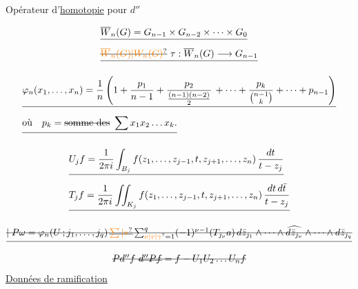 Opérateur d'\uline{homotopie} pour $d''$

\[
\begin{aligned}
&\deleted{\overline W_n(G)=G_{n-1}\times G_{n-2}\times\cdots\times G_0}\\
&\deleted{\deleted{\unsure{\overline W_n(G)|W_n(G)}}\ \tau:\overline W_n(G)\longrightarrow G_{n-1}}
\end{aligned}
\]

\[
\begin{aligned}
&\deleted{\varphi_n(x_1,\ldots,x_n)=\frac1n\left(1+\frac{p_1}{n-1}
+\frac{p_2}{\frac{(n-1)(n-2)}2}\,+\cdots+
\frac{p_k}{\binom{n-1}{k}}+\cdots+p_{n-1}\right)}\\
&\deleted{\text{où}\quad p_k=\deleted{\text{somme des}}\ \sum x_1 x_2\ldots x_k.}
\end{aligned}
\]

\[
\begin{aligned}
&\deleted{U_j f=\frac{1}{2\pi i}\int_{B_j} f(z_1,\ldots,z_{j-1},t,z_{j+1},\ldots,z_n)\,\frac{dt}{t-z_j}}\\
&\deleted{T_j f=\frac{1}{2\pi i}\iint_{K_j} f(z_1,\ldots,z_{j-1},t,z_{j+1},\ldots,z_n)\,\frac{dt\,d\bar t}{t-z_j}}
\end{aligned}
\]


\[
\deleted{\underline{\left|\vphantom{\sum^q}\right. P\omega=\varphi_n(U\,;j_1,\ldots,j_q)\,\deleted{\unsure{\sum|\ast}}\sum_{\unsure{\nu|v|\gamma}=1}^{q}(-1)^{\nu-1}
(T_{j_\nu}a)\,d\bar z_{j_1}\wedge\cdots\wedge\widehat{d\bar z_{j_\nu}}\wedge\cdots\wedge d\bar z_{j_q}}}
\]

\[
\deleted{P d'' f\ \deleted{d''P f}=f-U_1 U_2\ldots U_n f}
\]
\uline{Données de ramification}


